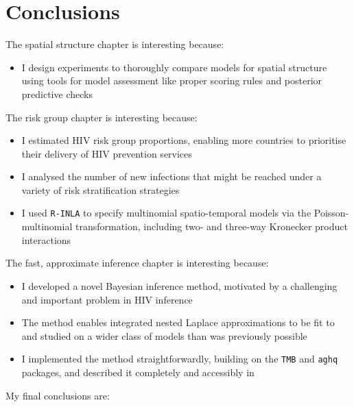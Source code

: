 \documentclass[a4paper, nobind]{templates/ociamthesis}
\providecommand{\tightlist}{%
  \setlength{\itemsep}{0pt}\setlength{\parskip}{0pt}}
\begin{document}
\hypertarget{conclusions-1}{%
\section{Conclusions}\label{conclusions-1}}

The spatial structure chapter is interesting because:

\begin{itemize}
\tightlist
\item
  I design experiments to thoroughly compare models for spatial structure using tools for model assessment like proper scoring rules and posterior predictive checks
\end{itemize}

The risk group chapter is interesting because:

\begin{itemize}
\tightlist
\item
  I estimated HIV risk group proportions, enabling more countries to prioritise their delivery of HIV prevention services
\item
  I analysed the number of new infections that might be reached under a variety of risk stratification strategies
\item
  I used \texttt{R-INLA} to specify multinomial spatio-temporal models via the Poisson-multinomial transformation, including two- and three-way Kronecker product interactions
\end{itemize}

The fast, approximate inference chapter is interesting because:

\begin{itemize}
\tightlist
\item
  I developed a novel Bayesian inference method, motivated by a challenging and important problem in HIV inference
\item
  The method enables integrated nested Laplace approximations to be fit to and studied on a wider class of models than was previously possible
\item
  I implemented the method straightforwardly, building on the \texttt{TMB} and \texttt{aghq} packages, and described it completely and accessibly in \textcite{howes2023integrated}
\end{itemize}

My final conclusions are:
\end{document}
